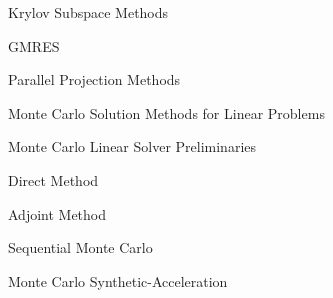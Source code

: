 \documentclass{beamer}
\begin{document}
\begin{frame}{Krylov Subspace Methods}

\end{frame}

\begin{frame}{GMRES}

\end{frame}

\begin{frame}{Parallel Projection Methods}

\end{frame}

\begin{frame}{Monte Carlo Solution Methods for Linear Problems}

\end{frame}

\begin{frame}{Monte Carlo Linear Solver Preliminaries}

\end{frame}

\begin{frame}{Direct Method}

\end{frame}

\begin{frame}{Adjoint Method}

\end{frame}

\begin{frame}{Sequential Monte Carlo}

\end{frame}

\begin{frame}{Monte Carlo Synthetic-Acceleration}

\end{frame}
\end{document}
